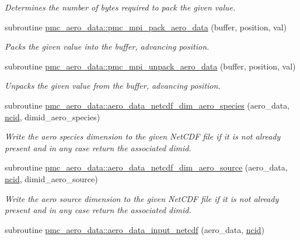 \begin{DoxyCompactItemize}
\begin{DoxyCompactList}\small\item\em Determines the number of bytes required to pack the given value. \end{DoxyCompactList}\item 
subroutine \mbox{\hyperlink{namespacepmc__aero__data_a7017ecdf5894fa10fa518425cd68c9a1}{pmc\+\_\+aero\+\_\+data\+::pmc\+\_\+mpi\+\_\+pack\+\_\+aero\+\_\+data}} (buffer, position, val)
\begin{DoxyCompactList}\small\item\em Packs the given value into the buffer, advancing position. \end{DoxyCompactList}\item 
subroutine \mbox{\hyperlink{namespacepmc__aero__data_a1e003120eba522c801d92c1ebc719dd8}{pmc\+\_\+aero\+\_\+data\+::pmc\+\_\+mpi\+\_\+unpack\+\_\+aero\+\_\+data}} (buffer, position, val)
\begin{DoxyCompactList}\small\item\em Unpacks the given value from the buffer, advancing position. \end{DoxyCompactList}\item 
subroutine \mbox{\hyperlink{namespacepmc__aero__data_a38b14f4b5a7b1ede2bb310e72f5bcf4c}{pmc\+\_\+aero\+\_\+data\+::aero\+\_\+data\+\_\+netcdf\+\_\+dim\+\_\+aero\+\_\+species}} (aero\+\_\+data, \mbox{\hyperlink{fractal_8_f90_a4e89f3f850921ff84a6dfce8b166ad50}{ncid}}, dimid\+\_\+aero\+\_\+species)
\begin{DoxyCompactList}\small\item\em Write the aero species dimension to the given Net\+C\+DF file if it is not already present and in any case return the associated dimid. \end{DoxyCompactList}\item 
subroutine \mbox{\hyperlink{namespacepmc__aero__data_a0ae31a1d2d6652d15476a653d82841c6}{pmc\+\_\+aero\+\_\+data\+::aero\+\_\+data\+\_\+netcdf\+\_\+dim\+\_\+aero\+\_\+source}} (aero\+\_\+data, \mbox{\hyperlink{fractal_8_f90_a4e89f3f850921ff84a6dfce8b166ad50}{ncid}}, dimid\+\_\+aero\+\_\+source)
\begin{DoxyCompactList}\small\item\em Write the aero source dimension to the given Net\+C\+DF file if it is not already present and in any case return the associated dimid. \end{DoxyCompactList}\item 
subroutine \mbox{\hyperlink{namespacepmc__aero__data_abcbb5ca81ead994280b5ea92f58172d8}{pmc\+\_\+aero\+\_\+data\+::aero\+\_\+data\+\_\+input\+\_\+netcdf}} (aero\+\_\+data, \mbox{\hyperlink{fractal_8_f90_a4e89f3f850921ff84a6dfce8b166ad50}{ncid}})

\end{DoxyCompactItemize}
